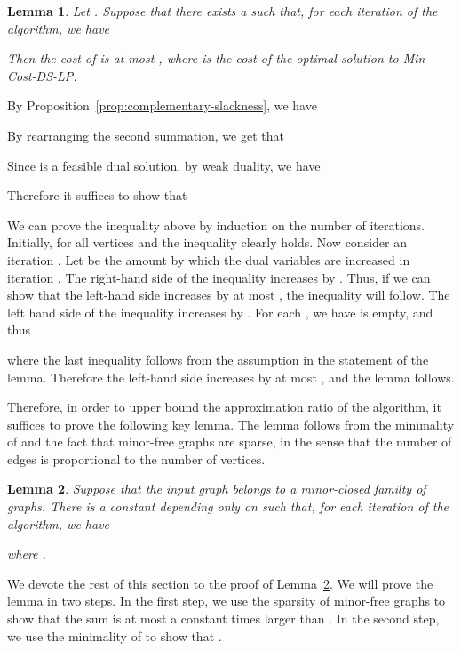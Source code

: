 \documentclass[11pt]{article}
\newtheorem{lemma}{Lemma}[section]
\renewenvironment{proof}{\vspace{-0.1in}\noindent{\bf Proof:}}{\hspace*{\fill}\par}
\def\prob#1{\textsf{\textup{#1}}\xspace}
\def\minDSlp{\prob{\minDS-LP}}
\def\minDS{\prob{Min-Cost-DS}}
\begin{document}
\begin{lemma} \label{lem:approx-condition}
	Let . Suppose that there exists a 
	such that, for each iteration  of the algorithm, we have
		
	Then the cost of  is at most , where
	 is the cost of the optimal solution to \minDSlp.
\end{lemma}
\begin{proof}
	By Proposition~\ref{prop:complementary-slackness}, we have
		
	By rearranging the second summation, we get that
		
	Since  is a feasible dual solution, by weak duality, we have
		
	Therefore it suffices to show that
		
	We can prove the inequality above by induction on the number of
	iterations. Initially,  for all vertices  and the
	inequality clearly holds. Now consider an iteration .
	Let  be the amount by which the dual variables
	 are increased in iteration . The
	right-hand side of the inequality increases by . Thus, if we can show that the left-hand side
	increases by at most , the inequality
	will follow. The left hand side of the inequality
	increases by . For each , we have  is empty, and thus
		
	where the last inequality follows from the assumption in the
	statement of the lemma. Therefore the left-hand side increases by
	at most , and the lemma follows.
\end{proof}

\medskip\noindent
Therefore, in order to upper bound the approximation ratio of the
algorithm, it suffices to prove the following key lemma. The lemma
follows from the minimality of  and the fact that minor-free
graphs are sparse, in the sense that the number of edges is
proportional to the number of vertices.

\begin{lemma} \label{lem:counting}
	Suppose that the input graph  belongs to a minor-closed
	familty  of graphs. There is a constant  depending
	only on  such that, for each iteration  of the algorithm,
	we have
		
	where .
\end{lemma}

\noindent
We devote the rest of this section to the proof of
Lemma~\ref{lem:counting}. We will prove the lemma in two steps. In
the first step, we use the sparsity of minor-free graphs to show that
the sum  is
at most a constant times larger than . In
the second step, we use the minimality of  to show that
.
\end{document}

